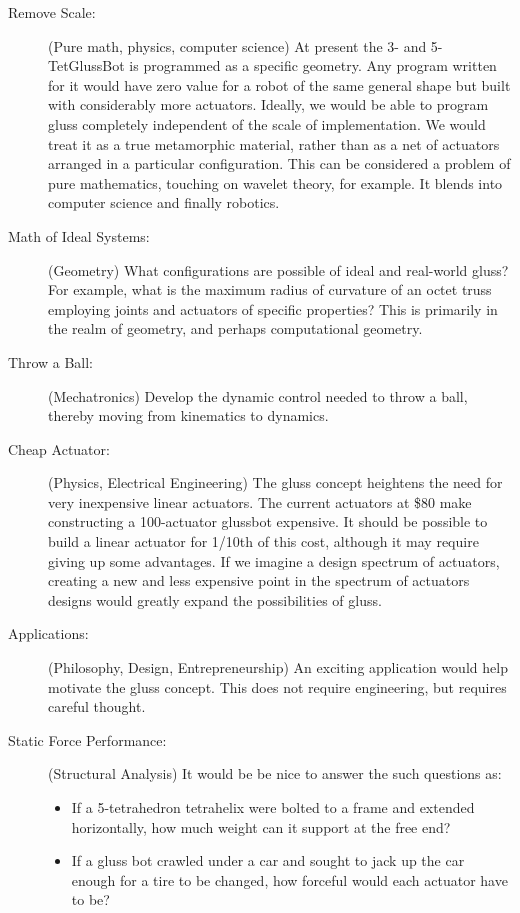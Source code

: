 \documentclass[11pt]{article}
\begin{document}
\begin{description}
\item [Remove Scale:] (Pure math, physics, computer science) At present the 3- and 5-TetGlussBot is programmed
  as a specific geometry. Any program
  written for it would have zero value for a robot of the same general shape but built with considerably
  more actuators. Ideally, we would be able to program gluss completely independent of the scale
  of implementation. We would treat it as a true metamorphic material, rather than as a net of
  actuators arranged in a particular configuration. This can be considered a problem of pure
  mathematics, touching on wavelet theory, for example. It blends into computer science and
  finally robotics.
\item [Math of Ideal Systems:] (Geometry) What configurations are possible of ideal and real-world gluss?
  For example, what is the maximum radius of curvature of an octet truss employing joints
  and actuators of specific properties? This is primarily in the realm of geometry, and perhaps
  computational geometry.
\item [Throw a Ball:] (Mechatronics) Develop the dynamic control needed to throw a ball, thereby moving from
  kinematics to dynamics.
\item [Cheap Actuator:] (Physics, Electrical Engineering) The gluss concept heightens the need for very inexpensive linear
  actuators. The current actuators at \$80 make constructing a 100-actuator glussbot expensive.
  It should be possible to build a linear actuator for 1/10th of this cost, although it may require
  giving up some advantages. If we imagine a design spectrum of actuators, creating a new and
  less expensive point in the spectrum of actuators designs would greatly
  expand the possibilities of gluss.
\item [Applications:] (Philosophy, Design, Entrepreneurship) An exciting application would help motivate the gluss concept. This does not
  require engineering, but requires careful thought.
\item [Static Force Performance:] (Structural Analysis)
It would be be nice to answer the such questions as:
\begin{itemize}  
\item If a 5-tetrahedron tetrahelix were bolted to a frame and extended horizontally, how much
  weight can it support at the free end?
\item If a gluss bot crawled under a car and sought to jack up the car enough for a tire
  to be changed, how forceful would each actuator have to be?

\end{itemize}
\end{description}
\end{document}
